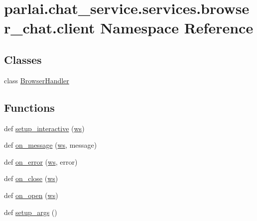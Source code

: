 \hypertarget{namespaceparlai_1_1chat__service_1_1services_1_1browser__chat_1_1client}{}\section{parlai.\+chat\+\_\+service.\+services.\+browser\+\_\+chat.\+client Namespace Reference}
\label{namespaceparlai_1_1chat__service_1_1services_1_1browser__chat_1_1client}
\subsection*{Classes}
\begin{DoxyCompactItemize}
\item 
class \hyperlink{classparlai_1_1chat__service_1_1services_1_1browser__chat_1_1client_1_1BrowserHandler}{Browser\+Handler}
\end{DoxyCompactItemize}
\subsection*{Functions}
\begin{DoxyCompactItemize}
\item 
def \hyperlink{namespaceparlai_1_1chat__service_1_1services_1_1browser__chat_1_1client_a207d7e8eedf4a062395e9e9c4f8338ff}{setup\+\_\+interactive} (\hyperlink{namespaceparlai_1_1chat__service_1_1services_1_1browser__chat_1_1client_a8fdfc8439baf6777a9c010e2b553fbf0}{ws})
\item 
def \hyperlink{namespaceparlai_1_1chat__service_1_1services_1_1browser__chat_1_1client_a0549c0132c2d2eee08eed3e4bbcb7def}{on\+\_\+message} (\hyperlink{namespaceparlai_1_1chat__service_1_1services_1_1browser__chat_1_1client_a8fdfc8439baf6777a9c010e2b553fbf0}{ws}, message)
\item 
def \hyperlink{namespaceparlai_1_1chat__service_1_1services_1_1browser__chat_1_1client_a7524afd04a18062c7ba273906adc70f3}{on\+\_\+error} (\hyperlink{namespaceparlai_1_1chat__service_1_1services_1_1browser__chat_1_1client_a8fdfc8439baf6777a9c010e2b553fbf0}{ws}, error)
\item 
def \hyperlink{namespaceparlai_1_1chat__service_1_1services_1_1browser__chat_1_1client_a9dc3b2493e22a73e05cc2c1220b75ca3}{on\+\_\+close} (\hyperlink{namespaceparlai_1_1chat__service_1_1services_1_1browser__chat_1_1client_a8fdfc8439baf6777a9c010e2b553fbf0}{ws})
\item 
def \hyperlink{namespaceparlai_1_1chat__service_1_1services_1_1browser__chat_1_1client_a04f3d9d0fe1870baaa214de4064afb17}{on\+\_\+open} (\hyperlink{namespaceparlai_1_1chat__service_1_1services_1_1browser__chat_1_1client_a8fdfc8439baf6777a9c010e2b553fbf0}{ws})
\item 
def \hyperlink{namespaceparlai_1_1chat__service_1_1services_1_1browser__chat_1_1client_a20c9862417d1f1a61b06551de0820ee4}{setup\+\_\+args} ()
\end{DoxyCompactItemize}
